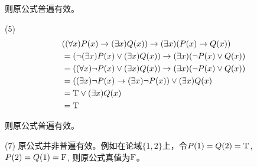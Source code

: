 \documentclass[hyperref, UTF8]{ctexart}
\newcommand{\true}{{\rm T}}
\newcommand{\false}{{\rm F}}
\begin{document}
则原公式普遍有效。

(5)
\begin{align*}
& ( ( \forall x)P(x) \rightarrow ( \exists x)Q(x)) \rightarrow ( \exists x)(P(x) \rightarrow Q(x))
\\ &= (\lnot ( \exists x)P(x) \lor ( \exists x)Q(x)) \rightarrow ( \exists x)(\lnot P(x) \lor Q(x))
\\ &= ( ( \forall x) \lnot P(x) \lor ( \exists x)Q(x)) \rightarrow ( \exists x)(\lnot P(x) \lor Q(x))
\\ &= ( ( \exists x) \lnot P(x) \rightarrow ( \exists x) \lnot P(x)) \lor ( \exists x)Q(x)
\\ &= \true \lor ( \exists x)Q(x)
\\ &= \true 
\end{align*}

则原公式普遍有效。

(7) 原公式并非普遍有效。例如在论域$\{1,2\}$上，令$P(1)=Q(2)=\true$, $P(2)=Q(1)=\false$, 则原公式真值为$\false$。
\end{document}
